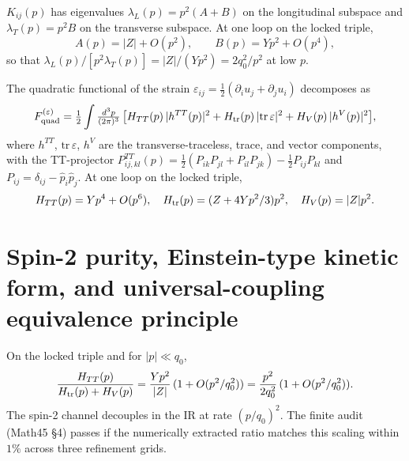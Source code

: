 \begin{lemma}
\label{lem:LT-spectrum}
$K_{ij}(p)$ has eigenvalues $\lambda_L(p) = p^2 (A + B)$ on the
longitudinal subspace and $\lambda_T(p) = p^2 B$ on the transverse
subspace. At one loop on the locked triple,
\begin{equation}
A(p) = |Z| + O(p^2), \qquad B(p) = Y p^2 + O(p^4),
\end{equation}
so that $\lambda_L(p) / [p^2 \lambda_T(p)] = |Z| / (Y p^2) =
2 q_0^2 / p^2$ at low $p$.
\end{lemma}

\begin{lemma}
\label{lem:H-blocks}
The quadratic functional of the strain
$\varepsilon_{ij} = \tfrac{1}{2}(\partial_i u_j + \partial_j u_i)$
decomposes as
\begin{equation}
F_{\rm quad}^{(\varepsilon)} = \tfrac{1}{2} \int
\tfrac{d^3 p}{(2\pi)^3}\, \big[
H_{TT}(p)\, |h^{TT}(p)|^2 + H_{\rm tr}(p)\,
|\mathrm{tr}\,\varepsilon|^2 + H_V(p)\, |h^V(p)|^2 \big],
\end{equation}
where $h^{TT}$, $\mathrm{tr}\,\varepsilon$, $h^V$ are the
transverse-traceless, trace, and vector components, with the
TT-projector
$P^{TT}_{ij,kl}(p) = \tfrac{1}{2}(P_{ik} P_{jl} + P_{il} P_{jk})
- \tfrac{1}{2} P_{ij} P_{kl}$ and $P_{ij} = \delta_{ij} -
\hat{p}_i \hat{p}_j$. At one loop on the locked triple,
\begin{equation}
H_{TT}(p) = Y p^4 + O(p^6),\quad
H_{\rm tr}(p) = (Z + 4 Y p^2/3) p^2,\quad
H_V(p) = |Z| p^2.
\end{equation}
\end{lemma}

\section{Spin-2 purity, Einstein-type kinetic form, and
universal-coupling equivalence principle}\label{sec:einstein}

\begin{theorem}
\label{thm:purity}
On the locked triple and for $|p| \ll q_0$,
\begin{equation}
\frac{H_{TT}(p)}{H_{\rm tr}(p) + H_V(p)}
= \frac{Y p^2}{|Z|}\,(1 + O(p^2/q_0^2))
= \frac{p^2}{2 q_0^2}\,(1 + O(p^2/q_0^2)).
\end{equation}
The spin-2 channel decouples in the IR at rate $(p/q_0)^2$. The
finite audit (Math45 \S4) passes if the numerically extracted ratio
matches this scaling within $1\%$ across three refinement grids.
\end{theorem}

